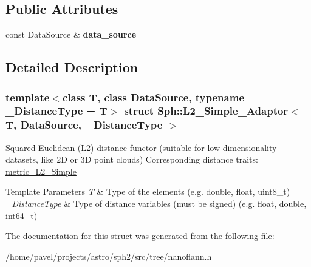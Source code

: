 \subsection*{Public Attributes}
\begin{DoxyCompactItemize}
\item 
\hypertarget{structSph_1_1L2__Simple__Adaptor_afa798b02f002ae0336a794820fd090ab}{}\label{structSph_1_1L2__Simple__Adaptor_afa798b02f002ae0336a794820fd090ab} 
const Data\+Source \& {\bfseries data\+\_\+source}
\end{DoxyCompactItemize}


\subsection{Detailed Description}
\subsubsection*{template$<$class T, class Data\+Source, typename \+\_\+\+Distance\+Type = T$>$\newline
struct Sph\+::\+L2\+\_\+\+Simple\+\_\+\+Adaptor$<$ T, Data\+Source, \+\_\+\+Distance\+Type $>$}

Squared Euclidean (L2) distance functor (suitable for low-\/dimensionality datasets, like 2D or 3D point clouds) Corresponding distance traits\+: \hyperlink{structSph_1_1metric__L2__Simple}{metric\+\_\+\+L2\+\_\+\+Simple} 
\begin{DoxyTemplParams}{Template Parameters}
{\em T} & Type of the elements (e.\+g. double, float, uint8\+\_\+t) \\
\hline
{\em \+\_\+\+Distance\+Type} & Type of distance variables (must be signed) (e.\+g. float, double, int64\+\_\+t) \\
\hline
\end{DoxyTemplParams}


The documentation for this struct was generated from the following file\+:\begin{DoxyCompactItemize}
\item 
/home/pavel/projects/astro/sph2/src/tree/nanoflann.\+h\end{DoxyCompactItemize}
